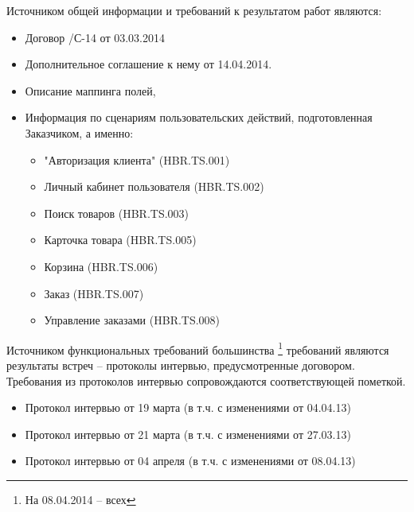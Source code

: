 
Источником общей информации и требований к результатом работ являются:
\begin{itemize}
\item Договор /С-14 от 03.03.2014
\item Дополнительное соглашение к нему  от 14.04.2014. 
\item Описание маппинга полей,
\item Информация по сценариям пользовательских действий, подготовленная Заказчиком, а именно:
\begin{itemize} 
 \item "Авторизация клиента" (HBR.TS.001)
 \item Личный кабинет пользователя (HBR.TS.002) 
 \item Поиск товаров (HBR.TS.003) 
 \item Карточка товара (HBR.TS.005)
 \item Корзина (HBR.TS.006)
 \item Заказ (HBR.TS.007) 
 \item Управление заказами (HBR.TS.008)
\end{itemize}
\end{itemize}

Источником функциональных требований большинства \footnote{На 08.04.2014 -- всех} требований являются результаты встреч -- протоколы интервью, предусмотренные договором. Требования из протоколов интервью сопровождаются соответствующей пометкой. 

\begin{itemize}
\item Протокол интервью от 19 марта (в т.ч. с изменениями от 04.04.13)
\item Протокол интервью от 21 марта (в т.ч. с изменениями от 27.03.13)
\item Протокол интервью от 04 апреля (в т.ч. с изменениями от 08.04.13)
\end{itemize}



